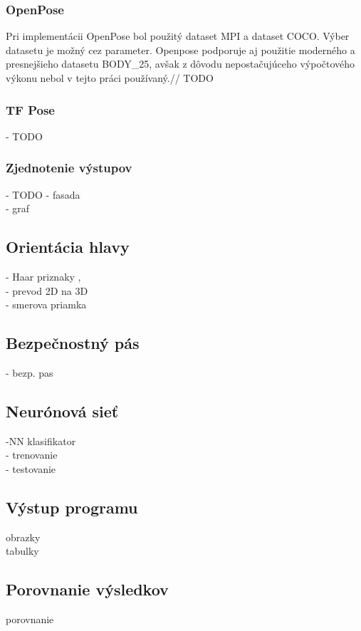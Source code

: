 \documentclass[slovak,master,dept460,male,cpp,cpdeclaration]{diploma}
\begin{document}
\subsubsection*{OpenPose}
 Pri implementácii OpenPose bol použitý dataset MPI a dataset COCO. Výber datasetu je možný cez parameter. Openpose podporuje aj použitie moderného a presnejšieho datasetu BODY\_25, avšak z dôvodu nepostačujúceho výpočtového výkonu nebol v tejto práci používaný.// TODO

\subsubsection*{TF Pose}
- TODO


\subsubsection*{Zjednotenie výstupov}
- TODO
- fasada\\
- graf


\newpage

 
\newpage
\subsection{Orientácia hlavy}
\label{sec:headOrientation}
- Haar  priznaky ,\\
- prevod 2D na 3D \\
- smerova priamka

\newpage
\subsection{Bezpečnostný pás}
\label{sec:safeBelt}
- bezp. pas

\newpage
\subsection{Neurónová sieť}
\label{sec:neuralNetwork}
-NN klasifikator\\
- trenovanie \\
- testovanie

\newpage
\subsection{Výstup programu}
obrazky\\
tabulky

\newpage
\subsection{Porovnanie výsledkov}
porovnanie
\end{document}
